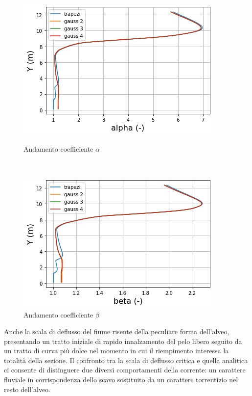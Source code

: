 \documentclass[12pt]{article} %
\begin{document}
\begin{figure}[H]
\begin{minipage}[b]{8.5cm}
\centering
    \includegraphics[width=1 \textwidth]{alphata.png}
    \caption{Andamento coefficiente $\alpha$}
    \label{fig:Tanaro_alfa}
\end{minipage}
\ \hspace{2mm} \hspace{3mm} \
\begin{minipage}[b]{8.5cm}
    \centering
    \includegraphics[width=1 \textwidth]{betata.png}
    \caption{Andamento coefficiente $\beta$}
    \label{fig:Tanaro_beta}
\end{minipage}
\end{figure}

\noindent Anche la scala di deflusso del fiume risente della peculiare forma dell’alveo, presentando un tratto iniziale di rapido innalzamento del pelo libero seguito da un tratto di curva più dolce nel momento in cui il riempimento interessa la totalità della sezione. Il confronto tra la scala di deflusso critica e quella analitica ci consente di distinguere due diversi comportamenti della corrente: un carattere fluviale in corrispondenza dello scavo sostituito da un carattere torrentizio nel resto dell’alveo.
\end{document}
